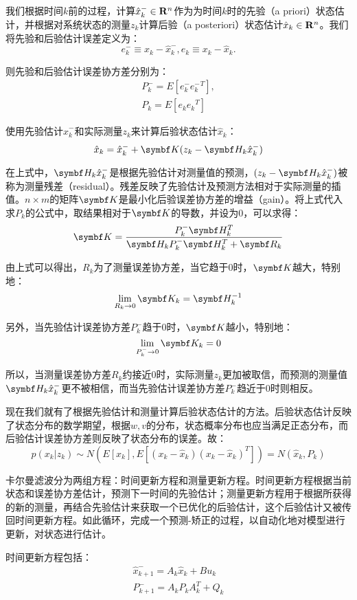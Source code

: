   我们根据时间$k$前的过程，计算$\hat{x}^{-}_k \in \mathbf{R}^n$作为为时间$k$时的先验（a priori）状态估计，并根据对系统状态的测量$z_k$计算后验（a posteriori）状态估计$\hat{x}_k \in \mathbf{R}^n$。我们将先验和后验估计误差定义为：
$$e^{-}_k \equiv x_k -\hat{x}^{-}_k, e_k \equiv x_k - \hat{x}_k. $$

  则先验和后验估计误差协方差分别为：
\begin{gather*}
P^{-}_k = E[e^{-}_k {e^{-}_k}^T],\\
P_k=E[e_k {e_k}^T]
\end{gather*}

  使用先验估计$\hat{x}^{-}_k$和实际测量$z_k$来计算后验状态估计$\hat{x}_k$：
$$\hat{x}_k = \hat{x}^{-}_k + \mat{K} (z_k - \mat{H}_k \hat{x}^{-}_k)$$

  在上式中，$\mat{H}_k \hat{x}^{-}_k$是根据先验估计对测量值的预测，$(z_k - \mat{H}_k \hat{x}^{-}_k)$被称为测量残差（residual）。残差反映了先验估计及预测方法相对于实际测量的插值。$n\times m$的矩阵$\mat{K}$是最小化后验误差协方差的增益（gain）。将上式代入求$P_k$的公式中，取结果相对于$\mat{K}$的导数，并设为0，可以求得：
$$\mat{K}=\frac{P^{-}_k \mat{H}^T_k}{\mat{H}_k P^{-}_k \mat{H}^T_k + \mat{R}_k}$$

  由上式可以得出，$R_k$为了测量误差协方差，当它趋于0时，$\mat{K}$越大，特别地：
$$\lim_{R_k \to 0} \mat{K}_k=\mat{H}^{-1}_k$$

  另外，当先验估计误差协方差$P^{-}_k$趋于0时，$\mat{K}$越小，特别地：
$$\lim_{P^{-}_k \to 0} \mat{K}_k=0$$

  所以，当测量误差协方差$R_k$约接近0时，实际测量$z_k$更加被取信，而预测的测量值$\mat{H}_k \hat{x}^{-}_k$更不被相信，而当先验估计误差协方差$P^{-}_k$趋近于0时则相反。
  
  现在我们就有了根据先验估计和测量计算后验状态估计的方法。后验状态估计反映了状态分布的数学期望，根据$w,v$的分布，状态概率分布也应当满足正态分布，而后验估计误差协方差则反映了状态分布的误差。故：
$$p(x_k|z_k)\sim N(E[x_k],E[(x_k-\hat{x}_k)(x_k-\hat{x}_k)^T])=N(\hat{x}_k,P_k)$$

  卡尔曼滤波分为两组方程：时间更新方程和测量更新方程。时间更新方程根据当前状态和误差协方差估计，预测下一时间的先验估计；测量更新方程用于根据所获得的新的测量，再结合先验估计来获取一个已优化的后验估计，这个后验估计又被传回时间更新方程。如此循环，完成一个预测-矫正的过程，以自动化地对模型进行更新，对状态进行估计。

  时间更新方程包括：
\begin{gather*}
\hat{x}^{-}_{k+1}=A_k \hat{x}_k + B u_k \\
P^{-}_{k+1}=A_k P_k A^T_k + Q_k
\end{gather*}

